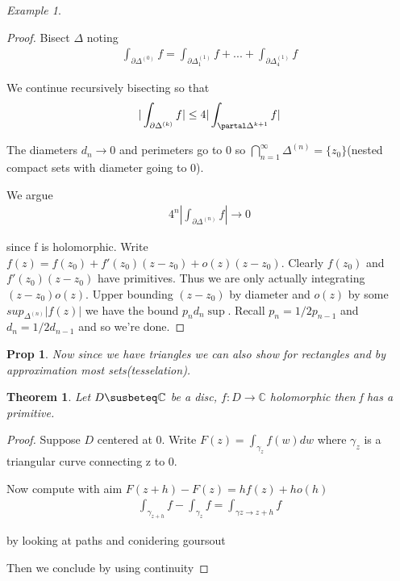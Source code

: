\documentclass[11pt]{article}
\newcommand{\C}{\mathbb{C}}
\newtheorem{theorem}{Theorem}
\newtheorem{prop}{Prop}
\theoremstyle{remark}
\newtheorem{example}{Example}
\begin{document}
\begin{example}
\begin{proof}
	Bisect $\Delta$ noting
	\begin{align*}
		\int_{\partial \Delta^{(0)}} f = \int_{\partial \Delta^{(1)}_1} f + ... + \int_{\partial \Delta^{(1)}_4} f
	\end{align*}

	We continue recursively bisecting so that
	\begin{align*}
		|\int_{\partial \Delta^{(k)}} f| \leq 4 |\int_{\partal \Delta^{k+1}} f|
	\end{align*}

	The diameters $d_n \to 0$ and perimeters go to 0 so $\bigcap_{n=1}^{\infty} \Delta^{(n)} = \{z_0\}$(nested compact sets with diameter going to 0).

	We argue
	\begin{align*}
		4^n |\int_{\partial \Delta^{(n)}} f| \to 0
	\end{align*}

	since f is holomorphic. Write $f(z) = f(z_0) + f'(z_0)(z-z_0) + o(z)(z-z_0)$. Clearly $f(z_0)$ and $f'(z_0)(z-z_0)$ have primitives. Thus we are only actually integrating $(z-z_0)o(z)$. Upper bounding $(z-z_0)$ by diameter and $o(z)$ by some $sup_{\Delta^{(n)}} |f(z)|$ we have the bound $p_n d_n \sup$. Recall $p_n = 1/2p_{n-1}$ and $d_n = 1/2 d_{n-1}$ and so we're done.
\end{proof}

\begin{prop}
	Now since we have triangles we can also show for rectangles and by approximation most sets(tesselation). 
\end{prop}

\begin{theorem}
	Let $D \susbeteq \C$ be a disc, $f: D \to \C$ holomorphic then f has a primitive. 
\end{theorem}

\begin{proof}
	Suppose $D$ centered at 0. Write $F(z) = \int_{\gamma_z} f(w)dw$ where $\gamma_z$ is a triangular curve connecting z to 0. 

	Now compute with aim $F(z+h) - F(z) = hf(z)+ho(h) $
	\begin{align*}
		\int_{\gamma_{z+h}} f - \int_{\gamma_z}f = \int_{\gamma{z \to z+h}} f 
	\end{align*}

	by looking at paths and conidering goursout

	Then we conclude by using continuity 
\end{proof}


\end{example}
\end{document}
